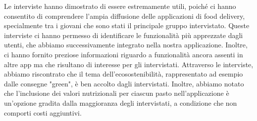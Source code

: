 \documentclass{article}
\begin{document}
    \par Le interviste hanno dimostrato di essere estremamente utili, poiché ci hanno consentito di comprendere l'ampia diffusione delle applicazioni di food delivery, specialmente tra i giovani che sono stati il principale gruppo intervistato. Queste interviste ci hanno permesso di identificare le funzionalità più apprezzate dagli utenti, che abbiamo successivamente integrato nella nostra applicazione. Inoltre, ci hanno fornito preziose informazioni riguardo a funzionalità ancora assenti in altre app ma che risultano di interesse per gli intervistati. Attraverso le interviste, abbiamo riscontrato che il tema dell'ecosostenibilità, rappresentato ad esempio dalle consegne "green", è ben accolto dagli intervistati. Inoltre, abbiamo notato che l'inclusione dei valori nutrizionali per ciascun pasto nell'applicazione è un'opzione gradita dalla maggioranza degli intervistati, a condizione che non comporti costi aggiuntivi.\par
\end{document}
